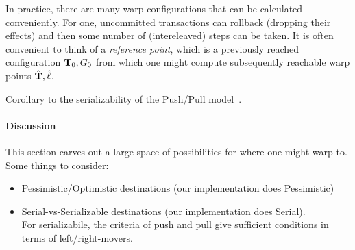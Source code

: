 
In practice, there are many warp configurations that can be calculated
conveniently. For one, uncommitted transactions can rollback (dropping
their effects) and then some number of (intereleaved) steps can be taken.
%
It is often convenient to think of a \emph{reference point}, which is
a previously reached configuration $\mathbf{T}_0,G_0$ from which one might
compute subsequently reachable warp points $\hat{\mathbf{T}},\hat{\ell}$.


    
\begin{theorem}[Serializability]
Corollary to the serializability of the Push/Pull model~\cite{pmpy}.
\end{theorem}


\paragraph{Discussion}

This section carves out a large space of possibilities for where one
might warp to. Some things to consider:

\begin{itemize}
\item Pessimistic/Optimistic destinations 
  (our implementation does Pessimistic)
\item Serial-vs-Serializable destinations
  (our implementation does Serial).\\
  For serializabile, the criteria of {\sc push} and {\sc pull} give
  sufficient conditions in terms of left/right-movers.
\end{itemize}



